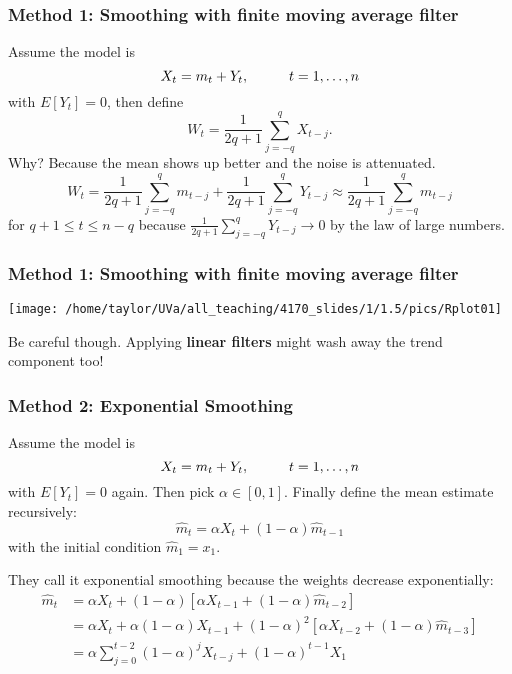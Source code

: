 \documentclass{beamer}
\begin{document}

\begin{frame}
\frametitle{Method 1: Smoothing with finite moving average filter}

Assume the model is 
\[
X_t = m_t + Y_t, \hspace{10mm} t=1,\ldots,n
\]
with $E[Y_t]=0$, then define
\[
W_t = \frac{1}{2q+1}\sum_{j=-q}^qX_{t-j}.
\]
Why? Because the mean shows up better and the noise is attenuated. 
\[
W_t = \frac{1}{2q+1}\sum_{j=-q}^q m_{t-j} + \frac{1}{2q+1}\sum_{j=-q}^q Y_{t-j} \approx \frac{1}{2q+1}\sum_{j=-q}^q m_{t-j}
\]
for $q + 1 \le t \le n - q$ because $\frac{1}{2q+1}\sum_{j=-q}^q Y_{t-j} \to 0$ by the law of large numbers.

\end{frame}


\begin{frame}
\frametitle{Method 1: Smoothing with finite moving average filter}

\begin{center}
\texttt{[image: /home/taylor/UVa/all\_teaching/4170\_slides/1/1.5/pics/Rplot01]}
\end{center}

Be careful though. Applying {\bf linear filters} might wash away the trend component too!

\end{frame}


\begin{frame}
\frametitle{Method 2: Exponential Smoothing}

Assume the model is 
\[
X_t = m_t + Y_t, \hspace{10mm} t=1,\ldots,n
\]
with $E[Y_t]=0$ again. Then pick $\alpha \in [0,1]$. Finally define the mean estimate recursively:
\[
\hat{m}_t = \alpha X_t + (1-\alpha) \hat{m}_{t-1}
\]
with the initial condition $\hat{m}_1 = x_1$.
\newline

They call it exponential smoothing because the weights decrease exponentially:
\begin{align*}
\hat{m}_t &= \alpha X_t + (1-\alpha)[\alpha X_{t-1} + (1-\alpha)\hat{m}_{t-2}] \\
&= \alpha X_t + \alpha (1-\alpha) X_{t-1} + (1-\alpha)^2 [\alpha X_{t-2} + (1-\alpha)\hat{m}_{t-3}]\\
&= \alpha \sum_{j=0}^{t-2}(1-\alpha)^jX_{t-j} + (1-\alpha)^{t-1}X_1
\end{align*}

\end{frame}
\end{document}

